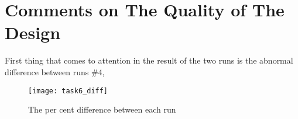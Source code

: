 \newpage
\section{Comments on The Quality of The Design}

First thing that comes to attention in the result of the two runs is the abnormal difference between runs \#4, 
\begin{figure}[H]
\begin{center}
\texttt{[image: task6\_diff]}
\end{center}
\caption{The per cent difference between each run}

\end{figure}